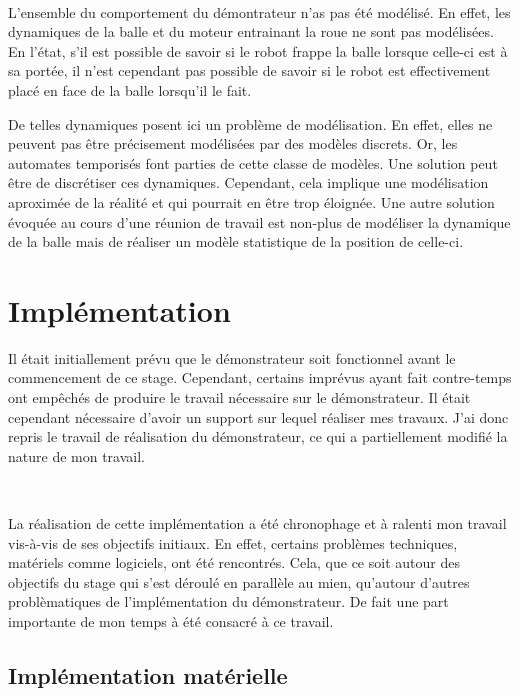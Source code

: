       ~
      
      L'ensemble du comportement du démontrateur n'as pas été modélisé.
      En effet, les dynamiques de la balle et du moteur entrainant la roue ne sont pas
      modélisées. En l'état, s'il est possible de savoir si le robot frappe la
      balle lorsque celle-ci est à sa portée, il n'est cependant pas possible de
      savoir si le robot est effectivement placé en face de la balle lorsqu'il
      le fait.
      
      De telles dynamiques posent ici un problème de modélisation. En effet, elles
      ne peuvent pas être précisement modélisées par des modèles discrets. Or,
      les automates temporisés font parties de cette classe de modèles.
      Une solution peut être de discrétiser ces dynamiques. Cependant, cela
      implique une modélisation aproximée de la réalité et qui pourrait en être
      trop éloignée. Une autre solution évoquée au cours d'une réunion de travail
      est non-plus de modéliser la dynamique de la balle mais de réaliser un
      modèle statistique de la position de celle-ci.
      
  \section{Implémentation}
      
      Il était initiallement prévu que le démonstrateur soit fonctionnel avant
      le commencement de ce stage. Cependant, certains imprévus ayant fait
      contre-temps ont empêchés de produire le travail nécessaire sur le
      démonstrateur. Il était cependant nécessaire d'avoir un support sur lequel réaliser mes
      travaux. J'ai donc repris le travail de réalisation du démonstrateur,
      ce qui a partiellement modifié la nature de mon travail.
      
      ~
      
      La réalisation de cette implémentation a été chronophage et à
      ralenti mon travail vis-à-vis de ses objectifs initiaux. En effet,
      certains problèmes techniques, matériels comme logiciels, ont été
      rencontrés. Cela, que ce soit autour des objectifs du stage qui s'est
      déroulé en parallèle au mien, qu'autour d'autres problèmatiques de
      l'implémentation du démonstrateur. De fait une part importante de mon
      temps à été consacré à ce travail.
  
    \subsection{Implémentation matérielle}
 
